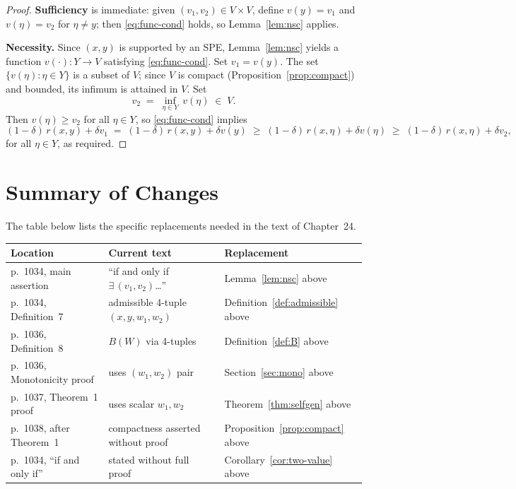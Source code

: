 \documentclass[12pt]{article}
\theoremstyle{definition}
\begin{document}
\begin{proof}
\textbf{Sufficiency} is immediate: given $(v_1, v_2) \in V \times V$, define
$v(y) = v_1$ and $v(\eta) = v_2$ for $\eta \neq y$; then
\eqref{eq:func-cond} holds, so Lemma~\ref{lem:nsc} applies.

\textbf{Necessity.}
Since $(x,y)$ is supported by an SPE, Lemma~\ref{lem:nsc} yields a function
$v(\cdot) : Y \to V$ satisfying \eqref{eq:func-cond}.
Set $v_1 = v(y)$.
The set $\{v(\eta) : \eta \in Y\}$ is a subset of $V$; since $V$ is compact
(Proposition~\ref{prop:compact}) and bounded, its infimum is attained in $V$.
Set
\[
v_2 \;=\; \inf_{\eta \in Y}\, v(\eta) \;\in\; V.
\]
Then $v(\eta) \geq v_2$ for all $\eta \in Y$, so \eqref{eq:func-cond} implies
\[
(1-\delta)\,r(x,y) + \delta v_1
\;=\;
(1-\delta)\,r(x,y) + \delta v(y)
\;\geq\;
(1-\delta)\,r(x,\eta) + \delta v(\eta)
\;\geq\;
(1-\delta)\,r(x,\eta) + \delta v_2,
\]
for all $\eta \in Y$, as required.
\end{proof}

\section{Summary of Changes}

The table below lists the specific replacements needed in the text of
Chapter~24.

\medskip
\begin{center}
\begin{tabular}{lll}
\hline
\textbf{Location} & \textbf{Current text} & \textbf{Replacement} \\
\hline
p.\ 1034, main assertion & ``if and only if $\exists\,(v_1,v_2)$\ldots'' &
  Lemma~\ref{lem:nsc} above \\
p.\ 1034, Definition~7 & admissible 4-tuple $(x,y,w_1,w_2)$ &
  Definition~\ref{def:admissible} above \\
p.\ 1036, Definition~8 & $B(W)$ via 4-tuples &
  Definition~\ref{def:B} above \\
p.\ 1036, Monotonicity proof & uses $(w_1,w_2)$ pair &
  Section~\ref{sec:mono} above \\
p.\ 1037, Theorem~1 proof & uses scalar $w_1, w_2$ &
  Theorem~\ref{thm:selfgen} above \\
p.\ 1038, after Theorem~1 & compactness asserted without proof &
  Proposition~\ref{prop:compact} above \\
p.\ 1034, ``if and only if'' & stated without full proof &
  Corollary~\ref{cor:two-value} above \\
\hline
\end{tabular}
\end{center}
\end{document}
